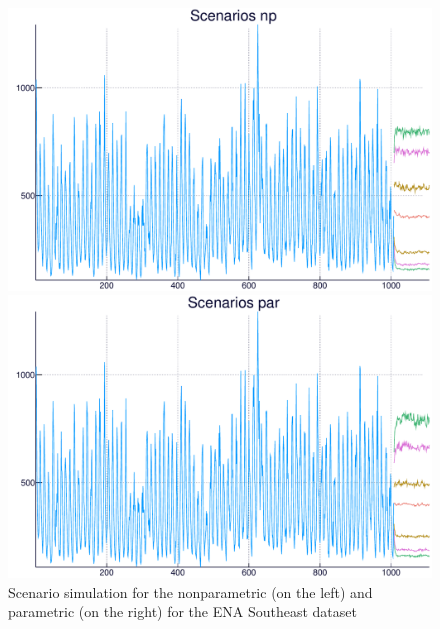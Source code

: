 \begin{figure}
	\centering
	\begin{minipage}[t]{\linewidth}
		\centering
		\begin{minipage}[t]{0.45\linewidth}
			\centering     \includegraphics[width=\textwidth]{Figuras/simulation/enasudeste-np}
		\end{minipage}
		\begin{minipage}[t]{0.45\linewidth}
			\centering     \includegraphics[width=\textwidth]{Figuras/simulation/enasudeste-par}
		\end{minipage}
	\end{minipage}
	\caption{Scenario simulation for the nonparametric (on the left) and parametric (on the right) for the ENA Southeast dataset}
	\label{fig:scenario}
\end{figure}






